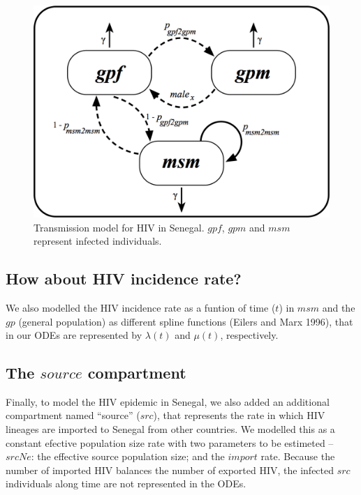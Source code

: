 \documentclass[12pt,]{article}
\begin{document}
\begin{figure}[H]

{\centering \includegraphics[width=0.9\linewidth]{images/SN_model_v3} 

}

\caption{Transmission model for HIV in Senegal. $gpf$, $gpm$ and $msm$ represent infected individuals.}\label{fig:unnamed-chunk-1}
\end{figure}

\hypertarget{how-about-hiv-incidence-rate}{%
\subsection{How about HIV incidence
rate?}\label{how-about-hiv-incidence-rate}}

We also modelled the HIV incidence rate as a funtion of time (\(t\)) in
\(msm\) and the \(gp\) (general population) as different spline
functions (Eilers and Marx 1996), that in our ODEs are represented by
\(\lambda(t)\) and \(\mu(t)\), respectively.

\hypertarget{the-source-compartment}{%
\subsection{\texorpdfstring{The \(source\)
compartment}{The source compartment}}\label{the-source-compartment}}

Finally, to model the HIV epidemic in Senegal, we also added an
additional compartment named ``source'' (\(src\)), that represents the
rate in which HIV lineages are imported to Senegal from other countries.
We modelled this as a constant efective population size rate with two
parameters to be estimeted -- \(srcNe\): the effective source population
size; and the \(import\) rate. Because the number of imported HIV
balances the number of exported HIV, the infected \(src\) individuals
along time are not represented in the ODEs.
\end{document}
